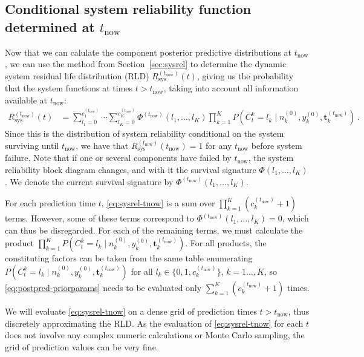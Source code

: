 \documentclass[authoryear]{elsarticle}
\renewcommand{\vec}[1]{{\bm#1}}
\newcommand{\uz}{^{(0)}} %
\def\ykz{y\uz_k}
\def\nkz{n\uz_k}
\def\tnow{t_\text{now}}
\newcommand{\Rsysnow}{R^{(t_\text{now})}_\text{sys}}
\def\cknow{c_k^{(\tnow)}}
\def\vectknow{\vec{t}_k^{(\tnow)}}
\def\Phinow{\Phi^{(\tnow)}}
\begin{document}
\subsection{Conditional system reliability function determined at $\tnow$}
\label{sec:sysreltnow}

Now that we can calulate the component posterior predictive distributions at $\tnow$,
we can use the method from Section~\ref{sec:sysrel}
to determine the dynamic system residual life distribution (RLD) $\Rsysnow(t)$,
giving us the probability that the system functions at times $t > \tnow$,
taking into account all information available at $\tnow$:
\begin{align}
\Rsysnow(t) &= \sum_{l_1=0}^{c_1^{(\tnow)}} \cdots \sum_{l_K=0}^{c_K^{(\tnow)}} \Phinow(l_1,\ldots,l_K)
               \prod_{k=1}^K P(C^k_t = l_k\mid\nkz,\ykz, \vectknow)\,.
\label{eq:sysrel-tnow}
\end{align}
Since this is the distribution of system reliability conditional on the system surviving until $\tnow$,
we have that $\Rsysnow(\tnow) = 1$ for any $\tnow$ before system failure.
Note that if one or several components have failed by $\tnow$,
the system reliability block diagram changes, and with it the survival signature $\Phi(l_1,\ldots,l_K)$.
We denote the current survival signature by $\Phinow(l_1,\ldots,l_K)$.

For each prediction time $t$,
\eqref{eq:sysrel-tnow} is a sum over $\prod_{k=1}^K (\cknow + 1)$ terms.
However, some of these terms correspond to $\Phinow(l_1,\ldots,l_K) = 0$,
which can thus be disregarded.
For each of the remaining terms,
we must calculate the product $\prod_{k=1}^K P(C^k_t = l_k\mid\nkz,\ykz, \vectknow)$.
For all products, the constituting factors can be taken from the same table
enumerating $P(C^k_t = l_k\mid\nkz,\ykz, \vectknow)$ for all $l_k \in \{0, 1, \cknow\}$, $k=1\ldots,K$,
so \eqref{eq:postpred-priorparams} needs to be evaluated 
only $\sum_{k=1}^K (\cknow + 1)$ times.

We will evaluate \eqref{eq:sysrel-tnow} on a dense grid of prediction times $t > \tnow$,
thus discretely approximating the RLD.
As the evaluation of \eqref{eq:sysrel-tnow} for each $t$ does not involve any complex numeric calculations or Monte Carlo sampling,
the grid of prediction values can be very fine.
%
\end{document}
